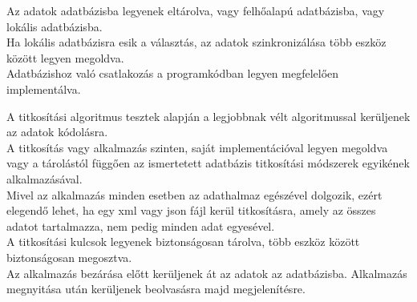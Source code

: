 Az adatok adatbázisba legyenek eltárolva, vagy felhőalapú adatbázisba, vagy lokális adatbázisba. 
\\Ha lokális adatbázisra esik a választás, az adatok szinkronizálása több eszköz között legyen megoldva.
\\Adatbázishoz való csatlakozás a programkódban legyen megfelelően implementálva.


A titkosítási algoritmus tesztek alapján a legjobbnak vélt algoritmussal kerüljenek az adatok kódolásra.
\\A titkosítás vagy alkalmazás szinten, saját implementációval legyen megoldva vagy a tárolástól függően az ismertetett adatbázis titkosítási módszerek egyikének alkalmazásával.
\\Mivel az alkalmazás minden esetben az adathalmaz egészével dolgozik, ezért elegendő lehet, ha egy xml vagy json fájl kerül titkosításra, amely az összes adatot tartalmazza, nem pedig minden adat egyesével.
\\A titkosítási kulcsok legyenek biztonságosan tárolva, több eszköz között biztonságosan megosztva.
\\Az alkalmazás bezárása előtt kerüljenek át az adatok az adatbázisba. Alkalmazás megnyitása után kerüljenek beolvasásra majd megjelenítésre.
